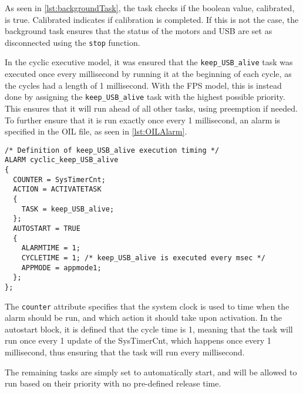 As seen in \autoref{lst:backgroundTask}, the task checks if the boolean value, calibrated, is true.
Calibrated indicates if calibration is completed.
If this is not the case, the background task ensures that the status of the motors and USB are set as disconnected using the \texttt{stop} function.

In the cyclic executive model, it was ensured that the \texttt{keep\_USB\_alive} task was executed once every millisecond by running it at the beginning of each cycle, as the cycles had a length of 1 millisecond.
With the FPS model, this is instead done by assigning the \texttt{keep\_USB\_alive} task with the highest possible priority.
This ensures that it will run ahead of all other tasks, using preemption if needed.
To further ensure that it is run exactly once every 1 millisecond, an alarm is specified in the OIL file, as seen in \autoref{lst:OILAlarm}.

\begin{lstlisting}[language=CSharp,label={lst:OILAlarm},caption={Alarm in the OIL}]
/* Definition of keep_USB_alive execution timing */
ALARM cyclic_keep_USB_alive
{
  COUNTER = SysTimerCnt;
  ACTION = ACTIVATETASK
  {
    TASK = keep_USB_alive;
  };
  AUTOSTART = TRUE
  {
    ALARMTIME = 1;
    CYCLETIME = 1; /* keep_USB_alive is executed every msec */
    APPMODE = appmode1;
  };
};
\end{lstlisting}

The \texttt{counter} attribute specifies that the system clock is used to time when the alarm should be run, and which action it should take upon activation.
In the autostart block, it is defined that the cycle time is 1, meaning that the task will run once every 1 update of the SysTimerCnt, which happens once every 1 millisecond, thus ensuring that the task will run every millisecond.

The remaining tasks are simply set to automatically start, and will be allowed to run based on their priority with no pre-defined release time.
